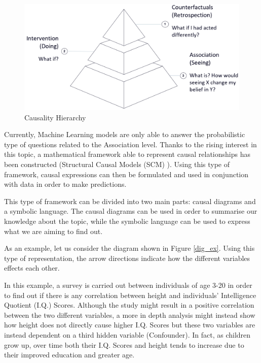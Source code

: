 \begin{figure}[ht!]%
    \centering
    \includegraphics[width=0.8\linewidth]{latex/images/pyramid.pdf}
    \vspace{-0.2cm}
    \caption{Causality Hierarchy}
    \label{pyr}
\end{figure}
\vspace{-0.5cm}

Currently, Machine Learning models are only able to answer the probabilistic type of questions related to the Association level.
Thanks to the rising interest in this topic, a mathematical framework able to represent causal relationships has been constructed (Structural Causal Models (SCM) \cite{tools}). Using this type of framework, causal expressions can then be formulated and used in conjunction with data in order to make predictions.

This type of framework can be divided into two main parts: causal diagrams and a symbolic language. The causal diagrams can be used in order to summarise our knowledge about the topic, while the symbolic language can be used to express what we are aiming to find out.

As an example, let us consider the diagram shown in Figure \ref{dig_ex}. Using this type of representation, the arrow directions indicate how the different variables effects each other.

In this example, a survey is carried out between individuals of age 3-20 in order to find out if there is any correlation between height and individuals' Intelligence Quotient (I.Q.) Scores. Although the study might result in a positive correlation between the two different variables, a more in depth analysis might instead show how height does not directly cause higher I.Q. Scores but these two variables are instead dependent on a third hidden variable (Confounder). In fact, as children grow up, over time both their I.Q. Scores and height tends to increase due to their improved education and greater age.  

